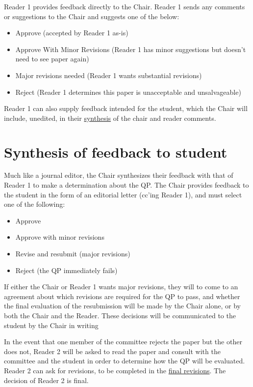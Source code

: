 \documentclass[
]{book}
\providecommand{\tightlist}{%
  \setlength{\itemsep}{0pt}\setlength{\parskip}{0pt}}
\begin{document}
Reader 1 provides feedback directly to the Chair. Reader 1 sends any comments or suggestions to the Chair and suggests one of the below:

\begin{itemize}
\tightlist
\item
  Approve (accepted by Reader 1 as-is)
\item
  Approve With Minor Revisions (Reader 1 has minor suggestions but doesn't need to see paper again)
\item
  Major revisions needed (Reader 1 wants substantial revisions)
\item
  Reject (Reader 1 determines this paper is unacceptable and unsalvageable)
\end{itemize}

Reader 1 can also supply feedback intended for the student, which the Chair will include, unedited, in their \hyperref[synthesis]{synthesis} of the chair and reader comments.

\section{Synthesis of feedback to student}\label{synthesis}

Much like a journal editor, the Chair synthesizes their feedback with that of Reader 1 to make a determination about the QP. The Chair provides feedback to the student in the form of an editorial letter (cc'ing Reader 1), and must select one of the following:

\begin{itemize}
\tightlist
\item
  Approve
\item
  Approve with minor revisions
\item
  Revise and resubmit (major revisions)
\item
  Reject (the QP immediately fails)
\end{itemize}

If either the Chair or Reader 1 wants major revisions, they will to come to an agreement about which revisions are required for the QP to pass, and whether the final evaluation of the resubmission will be made by the Chair alone, or by both the Chair and the Reader. These decisions will be communicated to the student by the Chair in writing

In the event that one member of the committee rejects the paper but the other does not, Reader 2 will be asked to read the paper and consult with the committee and the student in order to determine how the QP will be evaluated. Reader 2 can ask for revisions, to be completed in the \hyperref[revisions]{final revisions}. The decision of Reader 2 is final.
\end{document}
